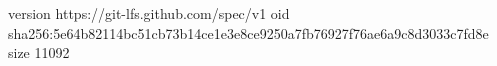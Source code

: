 version https://git-lfs.github.com/spec/v1
oid sha256:5e64b82114bc51cb73b14ce1e3e8ce9250a7fb76927f76ae6a9c8d3033c7fd8e
size 11092
